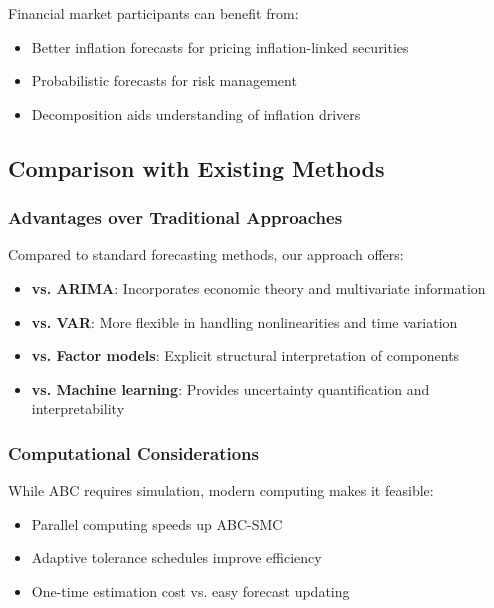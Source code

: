 Financial market participants can benefit from:

\begin{itemize}
    \item Better inflation forecasts for pricing inflation-linked securities
    \item Probabilistic forecasts for risk management
    \item Decomposition aids understanding of inflation drivers
\end{itemize}

\subsection{Comparison with Existing Methods}

\subsubsection{Advantages over Traditional Approaches}

Compared to standard forecasting methods, our approach offers:

\begin{itemize}
    \item \textbf{vs. ARIMA}: Incorporates economic theory and multivariate information
    \item \textbf{vs. VAR}: More flexible in handling nonlinearities and time variation
    \item \textbf{vs. Factor models}: Explicit structural interpretation of components
    \item \textbf{vs. Machine learning}: Provides uncertainty quantification and interpretability
\end{itemize}

\subsubsection{Computational Considerations}

While ABC requires simulation, modern computing makes it feasible:

\begin{itemize}
    \item Parallel computing speeds up ABC-SMC
    \item Adaptive tolerance schedules improve efficiency
    \item One-time estimation cost vs. easy forecast updating
\end{itemize}

